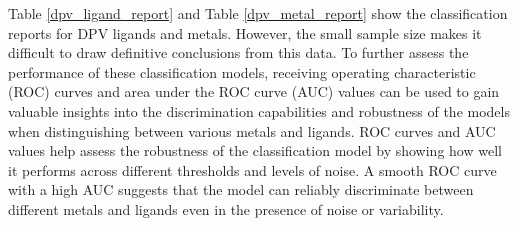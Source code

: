 Table \ref{dpv_ligand_report} and Table \ref{dpv_metal_report} show the classification reports for DPV ligands and metals. However, the small sample size makes it difficult to draw definitive conclusions from this data. To further assess the performance of these classification models, receiving operating characteristic (ROC) curves and area under the ROC curve (AUC) values can be used to gain valuable insights into the discrimination capabilities and robustness of the models when distinguishing between various metals and ligands. ROC curves and AUC values help assess the robustness of the classification model by showing how well it performs across different thresholds and levels of noise. A smooth ROC curve with a high AUC suggests that the model can reliably discriminate between different metals and ligands even in the presence of noise or variability. 

